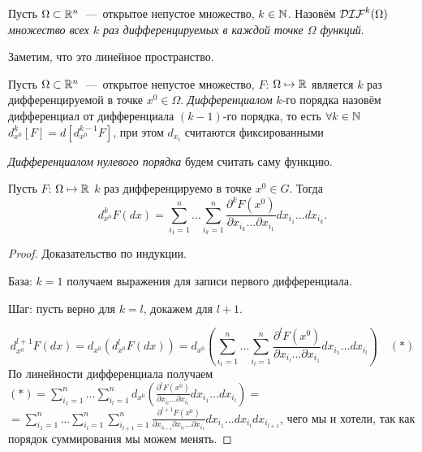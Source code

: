 \begin{definition}
    Пусть $\Omega \subset \mathbb{R}^n$~---~открытое непустое множество, $k \in \mathbb{N}$. Назовём $\mathcal{DIF}^{k} (\Omega)$ \textit{множество всех $k$ раз дифференцируемых в каждой точке $\Omega$ функций}.
\end{definition}

\begin{note}
    Заметим, что это линейное пространство.
\end{note}

\begin{definition}
    Пусть $\Omega \subset \mathbb{R}^n$~---~открытое непустое множество, $F$: $\Omega \mapsto \mathbb{R}$ является $k$ раз дифференцируемой в точке $x^{0} \in \Omega$. \textit{Дифференциалом} $k$-го порядка назовём дифференциал от дифференциала $(k-1)$-го порядка, то есть $\forall k \in \mathbb{N}$ $\displaystyle d_{x^{0}}^{k} [F] = d \left[d_{x^{0}}^{k-1} F \right]$, при этом $d_{x_i}$ считаются фиксированными %

    \textit{Дифференциалом нулевого порядка} будем считать саму функцию.
\end{definition}

\begin{lemma}
    Пусть $F$: $\Omega \mapsto \mathbb{R}$ $k$ раз дифференцируемо в точке $x^{0} \in G$. Тогда
    $$\displaystyle d_{x^0}^{k} F (dx) = \sum\limits_{i_1 = 1}^{n} \ldots \sum\limits_{i_k = 1}^{n} \frac{\partial^{k} F (x^0)}{\partial x_{i_k} \ldots \partial x_{i_1}} dx_{i_1} \ldots dx_{i_k}.$$
\end{lemma}

\begin{proof}
    Доказательство по индукции.

    База: $k = 1$ получаем выражения для записи первого дифференциала.

    Шаг: пусть верно для $k = l$, докажем для $l + 1$.

    $$d_{x^0}^{l + 1} F (dx) = d_{x^{0}} \left( d_{x^{0}}^{l} F (dx)\right) = d_{x^{0}} \left( \sum\limits_{i_1 = 1}^{n} \ldots \sum\limits_{i_l = 1}^{n} \frac{\partial^{l} F (x^0)}{\partial x_{i_l} \ldots \partial x_{i_1}} dx_{i_1} \ldots dx_{i_l}\right) \quad (*)$$
    По линейности дифференциала получаем $(*) = \sum\limits_{i_1 = 1}^{n} \ldots \sum\limits_{i_l = 1}^{n} d_{x^{0}} \left(\frac{\partial^{l} F (x^0)}{\partial x_{i_l} \ldots \partial x_{i_1}} dx_{i_1} \ldots dx_{i_l}\right) = $
    $= \sum\limits_{i_1 = 1}^{n} \ldots \sum\limits_{i_l = 1}^{n} \sum\limits_{i_{l+1} = 1}^{n}\frac{\partial^{l+1} F (x^0)}{\partial x_{i_{l+1}}\partial x_{i_l} \ldots \partial x_{i_1}} dx_{i_1} \ldots dx_{i_l} dx_{i_{l + 1}}$, чего мы и хотели, так как порядок суммирования мы можем менять.
\end{proof}

